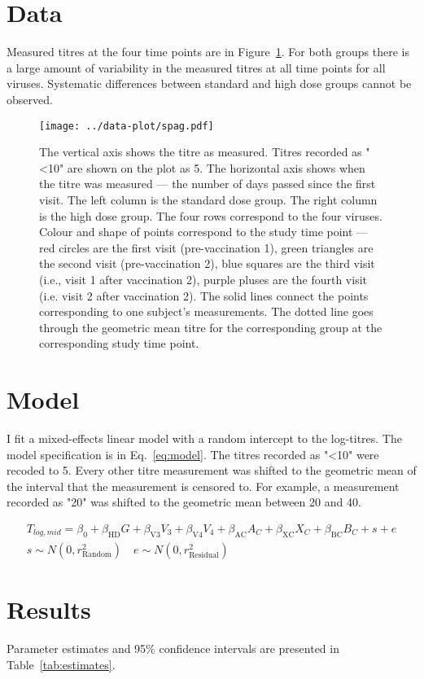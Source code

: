 \documentclass[11pt]{article}
\begin{document}
\section{Data}

Measured titres at the four time points are in Figure~\ref{fig:spag}.
For both groups there is a large amount of variability in the measured titres
at all time points for all viruses. Systematic differences between standard and
high dose groups cannot be observed.

\begin{figure}[htp]
    \centering
    \texttt{[image: ../data-plot/spag.pdf]}
    \caption{
        The vertical axis shows the titre as measured.
        Titres recorded as "<10" are shown on the plot as 5.
        The horizontal axis shows when the titre was measured --- the number of
        days passed since the first visit.
        The left column is the standard dose group.
        The right column is the high dose group.
        The four rows correspond to the four viruses.
        Colour and shape of points correspond to the study time point ---
        red circles are the first visit (pre-vaccination 1),
        green triangles are the second visit (pre-vaccination 2),
        blue squares are the third visit (i.e., visit 1 after vaccination 2),
        purple pluses are the fourth visit (i.e. visit 2 after vaccination 2).
        The solid lines connect the points
        corresponding to one subject's measurements.
        The dotted line goes through the geometric mean titre for the
        corresponding group at the corresponding study time point.
    }
    \label{fig:spag}
\end{figure}

\section{Model}

I fit a mixed-effects linear model with a random intercept to the log-titres.
The model specification is in Eq.~\ref{eq:model}.
The titres recorded as "<10" were recoded to 5. Every other titre measurement
was shifted to the geometric mean of the interval that the measurement
is censored to. For example, a measurement recorded as "20" was shifted to the
geometric mean between 20 and 40.

\begin{equation}
    \begin{gathered}
        \label{eq:model}
        T_{log,mid} = \beta_0 + \beta_{\text{HD}}G + \beta_{\text{V3}}V_3
        + \beta_{\text{V4}}V_4 + \beta_{\text{AC}}A_C
        + \beta_{\text{XC}}X_C + \beta_{\text{BC}}B_C
        + s + e\\
        s \sim N(0, r^2_{\text{Random}}) \quad e \sim N(0, r^2_{\text{Residual}})
    \end{gathered}
\end{equation}

\section{Results}

Parameter estimates and 95\% confidence intervals
are presented in Table~\ref{tab:estimates}.




\end{document}
